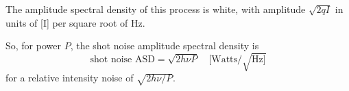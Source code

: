 The amplitude spectral density of this process is white, with
amplitude $\sqrt{2qI}$ in units of [I] per square root of Hz.

So, for power $P$, the shot noise amplitude spectral density is 
\begin{equation}
\text{shot noise ASD} = \sqrt{2 h\nu P}\quad [\text{Watts}/\sqrt{\text{Hz}]}
\label{eq:shotnoise-asd}
\end{equation}
for a relative intensity noise of $\sqrt{2 h\nu/P}$.

\cite{Quetschke2007Complex}
